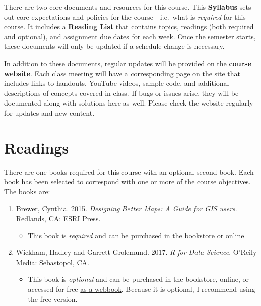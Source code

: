 \documentclass[
]{book}
\providecommand{\tightlist}{%
  \setlength{\itemsep}{0pt}\setlength{\parskip}{0pt}}
\begin{document}
There are two core documents and resources for this course. This \textbf{Syllabus} sets out core expectations and policies for the course - i.e.~what is \emph{required} for this course. It includes a \textbf{Reading List} that contains topics, readings (both required and optional), and assignment due dates for each week. Once the semester starts, these documents will only be updated if a schedule change is necessary.

In addition to these documents, regular updates will be provided on the \href{https://slu-soc5650.github.io}{\textbf{course website}}. Each class meeting will have a corresponding page on the site that includes links to handouts, YouTube videos, sample code, and additional descriptions of concepts covered in class. If bugs or issues arise, they will be documented along with solutions here as well. Please check the website regularly for updates and new content.

\hypertarget{readings}{%
\section{Readings}\label{readings}}

There are one books required for this course with an optional second book. Each book has been selected to correspond with one or more of the course objectives. The books are:

\begin{enumerate}
\def\labelenumi{\arabic{enumi}.}
\tightlist
\item
  Brewer, Cynthia. 2015. \emph{Designing Better Maps: A Guide for GIS users}. Redlands, CA: ESRI Press.

  \begin{itemize}
  \tightlist
  \item
    This book is \emph{required} and can be purchased in the bookstore or online
  \end{itemize}
\item
  Wickham, Hadley and Garrett Grolemund. 2017. \emph{R for Data Science}. O'Reily Media: Sebastopol, CA.

  \begin{itemize}
  \tightlist
  \item
    This book is \emph{optional} and can be purchased in the bookstore, online, or accessed for free \href{http://r4ds.had.co.nz}{as a webbook}. Because it is optional, I recommend using the free version.
  \end{itemize}
\end{enumerate}
\end{document}

